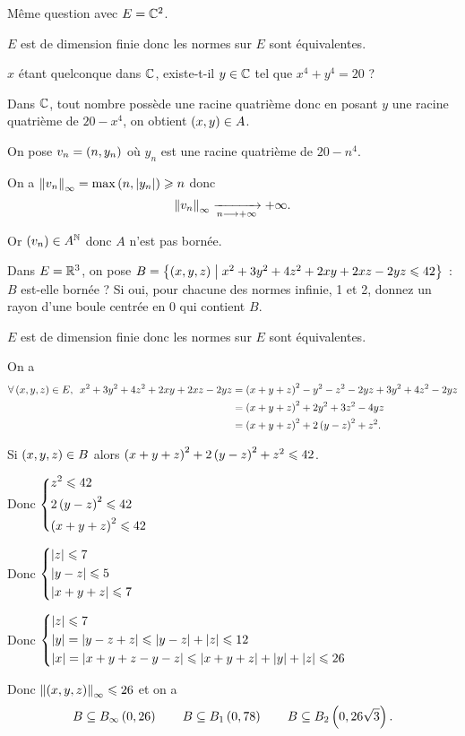 \begin{exo}
Même question avec \(E=\mathbb{C}^2\).
\end{exo}

\begin{corr}
\(E\) est de dimension finie donc les normes sur \(E\) sont équivalentes.

\(x\) étant quelconque dans \(\mathbb{C}\), existe-t-il \(y\in\mathbb{C}\) tel que \(x^4+y^4=20\) ?

Dans \(\mathbb{C}\), tout nombre possède une racine quatrième donc en posant \(y\) une racine quatrième de \(20-x^4\), on obtient \(\left(x,y\right)\in A\).

On pose \(v_n=\left(n,y_n\right)\) où \(y_n\) est une racine quatrième de \(20-n^4\).

On a \(\norme{v_n}_\infty=\max\paren{n,\abs{y_n}}\geq n\) donc \[\norme{v_n}_\infty\tendqd{n\to\pinf}\pinf.\]

Or \(\left(v_n\right)\in A^{\mathbb{N}}\) donc \(A\) n'est pas bornée.
\end{corr}

\begin{exo}
Dans \(E=\mathbb{R}^3\), on pose \(B=\left\lbrace\left(x,y,z\right)\;\middle|\; x^2+3y^2+4z^2+2xy+2xz-2yz\leqslant42\right\rbrace\) : \(B\) est-elle bornée ? Si oui, pour chacune des normes infinie, 1 et 2, donnez un rayon d'une boule centrée en \(0\) qui contient \(B\).
\end{exo}

\begin{corr}
\(E\) est de dimension finie donc les normes sur \(E\) sont équivalentes.

On a \[\begin{aligned}
\quantifs{\forall\paren{x,y,z}\in E}x^2+3y^2+4z^2+2xy+2xz-2yz&=\paren{x+y+z}^2-y^2-z^2-2yz+3y^2+4z^2-2yz \\
&=\paren{x+y+z}^2+2y^2+3z^2-4yz \\
&=\paren{x+y+z}^2+2\paren{y-z}^2+z^2.
\end{aligned}\]

Si \(\left(x,y,z\right)\in B\) alors \(\left(x+y+z\right)^2+2\left(y-z\right)^2+z^2\leqslant42\).

Donc \(\begin{dcases}
z^2\leqslant42 \\
2\left(y-z\right)^2\leqslant42 \\
\left(x+y+z\right)^2\leqslant42
\end{dcases}\)

Donc \(\begin{dcases}
\left\lvert z\right\rvert\leqslant7 \\
\left\lvert y-z\right\rvert\leqslant5 \\
\left\lvert x+y+z\right\rvert\leqslant7
\end{dcases}\)

Donc \(\begin{dcases}
\left\lvert z\right\rvert\leqslant7 \\
\left\lvert y\right\rvert=\left\lvert y-z+z\right\rvert\leqslant\left\lvert y-z\right\rvert+\left\lvert z\right\rvert\leqslant12 \\
\left\lvert x\right\rvert=\left\lvert x+y+z-y-z\right\rvert\leqslant\left\lvert x+y+z\right\rvert+\left\lvert y\right\rvert+\left\lvert z\right\rvert\leqslant26
\end{dcases}\)

Donc \(\norme{\paren{x,y,z}}_\infty\leq26\) et on a \[B\subset\bouleo[\infty]{0}{26}\qquad B\subset\bouleo[1]{0}{78}\qquad B\subset\bouleo[2]{0}{26\sqrt{3}}.\]
\end{corr}

